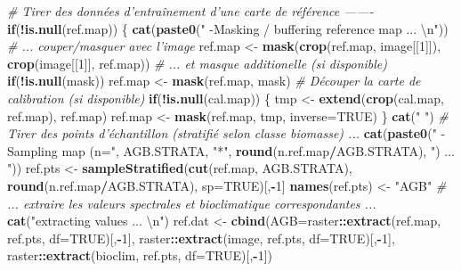 \documentclass[a4paper, notitlepage, 12pt, krantz2]{krantz}
\newenvironment{Shaded}{\begin{snugshade}}{\end{snugshade}}
\newcommand{\CharTok}[1]{\textcolor[rgb]{0.31,0.60,0.02}{#1}}
\newcommand{\CommentTok}[1]{\textcolor[rgb]{0.56,0.35,0.01}{\textit{#1}}}
\newcommand{\ControlFlowTok}[1]{\textcolor[rgb]{0.13,0.29,0.53}{\textbf{#1}}}
\newcommand{\DataTypeTok}[1]{\textcolor[rgb]{0.13,0.29,0.53}{#1}}
\newcommand{\DecValTok}[1]{\textcolor[rgb]{0.00,0.00,0.81}{#1}}
\newcommand{\KeywordTok}[1]{\textcolor[rgb]{0.13,0.29,0.53}{\textbf{#1}}}
\newcommand{\NormalTok}[1]{#1}
\newcommand{\OperatorTok}[1]{\textcolor[rgb]{0.81,0.36,0.00}{\textbf{#1}}}
\newcommand{\OtherTok}[1]{\textcolor[rgb]{0.56,0.35,0.01}{#1}}
\newcommand{\StringTok}[1]{\textcolor[rgb]{0.31,0.60,0.02}{#1}}
\begin{document}
\begin{Shaded}
\begin{Highlighting}[]
  \CommentTok{# Tirer des données d'entraînement d'une carte de référence -------}
  \ControlFlowTok{if}\NormalTok{(}\OperatorTok{!}\KeywordTok{is.null}\NormalTok{(ref.map)) \{}
    \KeywordTok{cat}\NormalTok{(}\KeywordTok{paste0}\NormalTok{(}\StringTok{"    -Masking / buffering reference map ... }\CharTok{\textbackslash{}n}\StringTok{"}\NormalTok{))}
    \CommentTok{# ... couper/masquer avec l'image}
\NormalTok{    ref.map  <-}\StringTok{ }\KeywordTok{mask}\NormalTok{(}\KeywordTok{crop}\NormalTok{(ref.map, image[[}\DecValTok{1}\NormalTok{]]), }\KeywordTok{crop}\NormalTok{(image[[}\DecValTok{1}\NormalTok{]], ref.map))}
    \CommentTok{# ... et masque additionelle (si disponible) }
    \ControlFlowTok{if}\NormalTok{(}\OperatorTok{!}\KeywordTok{is.null}\NormalTok{(mask)) ref.map <-}\StringTok{ }\KeywordTok{mask}\NormalTok{(ref.map, mask)                     }
    \CommentTok{# Découper la carte de calibration (si disponible) }
    \ControlFlowTok{if}\NormalTok{(}\OperatorTok{!}\KeywordTok{is.null}\NormalTok{(cal.map)) \{}
\NormalTok{       tmp <-}\StringTok{ }\KeywordTok{extend}\NormalTok{(}\KeywordTok{crop}\NormalTok{(cal.map, ref.map), ref.map)}
\NormalTok{       ref.map <-}\StringTok{ }\KeywordTok{mask}\NormalTok{(ref.map, tmp, }\DataTypeTok{inverse=}\OtherTok{TRUE}\NormalTok{)}
\NormalTok{    \}}
    \KeywordTok{cat}\NormalTok{(}\StringTok{"    "}\NormalTok{)}
    \CommentTok{# Tirer des points d'échantillon (stratifié selon classe biomasse) ...}
    \KeywordTok{cat}\NormalTok{(}\KeywordTok{paste0}\NormalTok{(}\StringTok{"    -Sampling map (n="}\NormalTok{, AGB.STRATA, }\StringTok{"*"}\NormalTok{, }\KeywordTok{round}\NormalTok{(n.ref.map}\OperatorTok{/}\NormalTok{AGB.STRATA), }\StringTok{") ... "}\NormalTok{))}
\NormalTok{    ref.pts <-}\StringTok{ }\KeywordTok{sampleStratified}\NormalTok{(}\KeywordTok{cut}\NormalTok{(ref.map, AGB.STRATA), }
                                \KeywordTok{round}\NormalTok{(n.ref.map}\OperatorTok{/}\NormalTok{AGB.STRATA), }\DataTypeTok{sp=}\OtherTok{TRUE}\NormalTok{)[,}\OperatorTok{-}\DecValTok{1}\NormalTok{]  }
    \KeywordTok{names}\NormalTok{(ref.pts) <-}\StringTok{ "AGB"}
    \CommentTok{# ... extraire les valeurs spectrales et bioclimatique correspondantes ...}
    \KeywordTok{cat}\NormalTok{(}\StringTok{"extracting values ... }\CharTok{\textbackslash{}n}\StringTok{"}\NormalTok{)}
\NormalTok{    ref.dat <-}\StringTok{ }\KeywordTok{cbind}\NormalTok{(}\DataTypeTok{AGB=}\NormalTok{raster}\OperatorTok{::}\KeywordTok{extract}\NormalTok{(ref.map, ref.pts, }\DataTypeTok{df=}\OtherTok{TRUE}\NormalTok{)[,}\OperatorTok{-}\DecValTok{1}\NormalTok{], }
\NormalTok{                     raster}\OperatorTok{::}\KeywordTok{extract}\NormalTok{(image, ref.pts, }\DataTypeTok{df=}\OtherTok{TRUE}\NormalTok{)[,}\OperatorTok{-}\DecValTok{1}\NormalTok{],}
\NormalTok{                     raster}\OperatorTok{::}\KeywordTok{extract}\NormalTok{(bioclim, ref.pts, }\DataTypeTok{df=}\OtherTok{TRUE}\NormalTok{)[,}\OperatorTok{-}\DecValTok{1}\NormalTok{])}
    

\end{Highlighting}
\end{Shaded}
\end{document}
